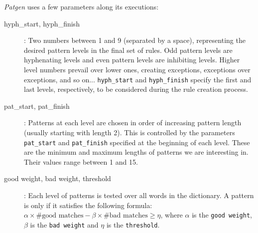 \emph{Patgen} uses a few parameters along its executions: 
\begin{description}
    \item[hyph\_start, hyph\_finish]: Two numbers between 1 and 9 (separated by a space), representing the desired pattern levels
	in the final set of rules. Odd pattern levels are hyphenating levels and even pattern levels are inhibiting levels. 
	Higher level numbers prevail over lower ones, creating exceptions, exceptions over exceptions, and so on... 
	\texttt{hyph\_start} and \texttt{hyph\_finish} specify the first and last levels, respectively, to be considered during the rule creation process.

    \item[pat\_start, pat\_finish]: Patterns at each level are chosen in order of increasing pattern length (usually starting with length 2). 
	This is controlled by the parameters \texttt{pat\_start} and \texttt{pat\_finish} specified at the beginning of each level. 
	These are the minimum and maximum lengths of patterns we are interesting in. Their values range between 1 and 15.

    \item[good weight, bad weight, threshold]: Each level of patterns is tested over all words in the dictionary.
	A pattern is only if it satisfies the following formula: $\alpha \times \#\text{good matches} - \beta \times \#\text{bad matches} \geq \eta$, where
	$\alpha$ is the \texttt{good weight}, $\beta$ is the \texttt{bad weight} and $\eta$ is the \texttt{threshold}.

\end{description}



